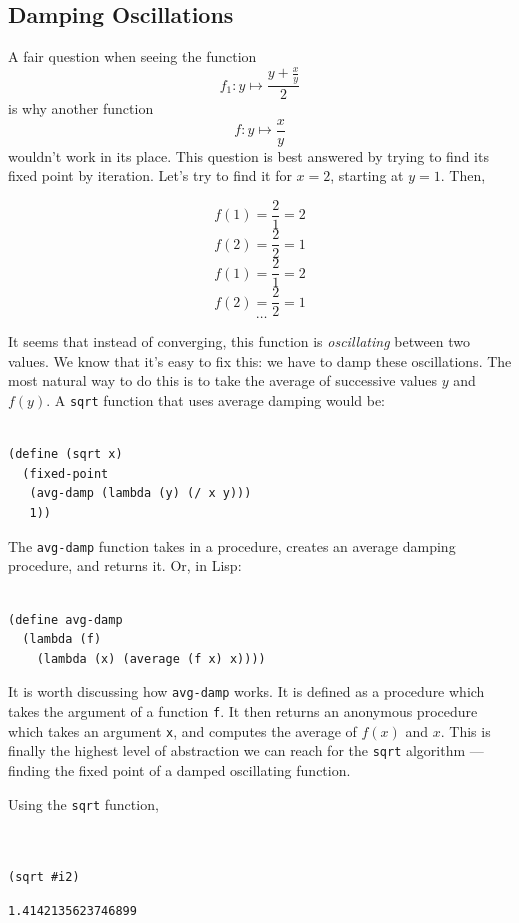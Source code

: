 \documentclass[9pt]{report}
\begin{document}
\subsection{Damping Oscillations}
\label{sec:org7e8f3d3}

A fair question when seeing the function
$$f_1\colon y\mapsto \frac{y+\frac{x}{y}}{2}$$
is why another function
$$f\colon y\mapsto \frac{x}{y}$$
wouldn't work in its place. This question is best
answered by trying to find its fixed point by iteration. Let's try
to find it for \(x=2\), starting at \(y=1\). Then,

$$f(1) = \frac{2}{1} = 2$$
$$f(2) = \frac{2}{2} = 1$$
$$f(1) = \frac{2}{1} = 2$$
$$f(2) = \frac{2}{2} = 1$$
$$~\dots$$

It seems that instead of converging, this function is
\emph{oscillating} between two values. We know that it's easy to fix
this: we have to damp these oscillations. The most natural way to
do this is to take the average of successive values \(y\) and
\(f(y)\). A \texttt{sqrt} function that uses average damping would be:

\begin{verbatim}

(define (sqrt x)
  (fixed-point
   (avg-damp (lambda (y) (/ x y)))
   1))
\end{verbatim}

The \texttt{avg-damp} function takes in a procedure, creates an average damping
procedure, and returns it. Or, in Lisp:

\begin{verbatim}

(define avg-damp
  (lambda (f)
    (lambda (x) (average (f x) x))))
\end{verbatim}

It is worth discussing how \texttt{avg-damp} works. It is defined as a
procedure which takes the argument of a function \texttt{f}. It then
returns an anonymous procedure which takes an argument \texttt{x}, and
computes the average of \(f(x)\) and \(x\). This is finally the
highest level of abstraction we can reach for the \texttt{sqrt}
algorithm --- finding the fixed point of a damped oscillating
function.

Using the \texttt{sqrt} function,

\begin{verbatim}


(sqrt #i2)
\end{verbatim}

\begin{verbatim}
1.4142135623746899
\end{verbatim}
\end{document}
